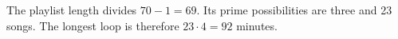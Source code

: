The playlist length divides $70-1=69$. Its prime possibilities are three and 23 songs. The longest loop is therefore $23\cdot4=\boxed{92}$ minutes.

